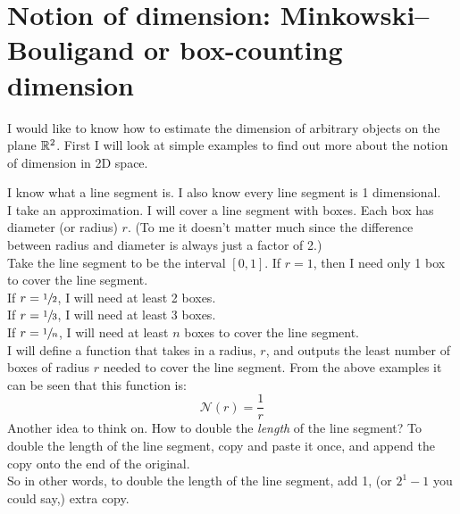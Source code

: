 \documentclass[11pt]{ekblite}
\begin{document}
\section{Notion of dimension: Minkowski–Bouligand or box-counting dimension}
I would like to know how to estimate the dimension of arbitrary objects on the plane $\mathbb{R}^2$. First I will look at simple examples to find out more about the notion of dimension in 2D space.
\begin{example}
	I know what a line segment is. I also know every line segment is 1 dimensional.
	\\[0.2in]I take an approximation. I will cover a line segment with boxes. Each box has diameter (or radius) $r$. (To me it doesn't matter much since the difference between radius and diameter is always just a factor of 2.)
	\\[0.2in]Take the line segment to be the interval $[0,1]$. If $r = 1$, then I need only 1 box to cover the line segment.
	\\[0.2in]If $r = \sfrac{1}{2}$, I will need at least 2 boxes.
	\\[0.2in]If $r = \sfrac{1}{3}$, I will need at least 3 boxes.
	\\[0.2in]If $r = \sfrac{1}{n}$, I will need at least $n$ boxes to cover the line segment.
	\\[0.2in]I will define a function that takes in a radius, $r$, and outputs the least number of boxes of radius $r$ needed to cover the line segment. From the above examples it can be seen that this function is:
	\[\mathcal{N}(r) = \frac{1}{r}\]
	Another idea to think on. How to double the \textit{length} of the line segment? To double the length of the line segment, copy and paste it once, and append the copy onto the end of the original. 
	\\[0.2in]So in other words, to double the length of the line segment, add 1, (or $2^1 - 1$ you could say,) extra copy.
\end{example}
\end{document}
